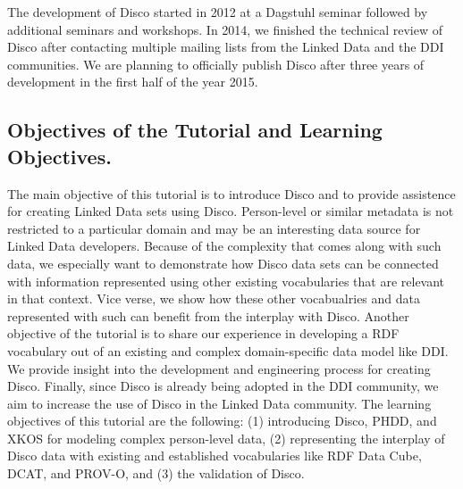 \documentclass{llncs}
\begin{document}
The development of Disco started in 2012 at a Dagstuhl seminar followed by additional seminars and workshops.  
In 2014, we finished the technical review of Disco after contacting multiple mailing lists from the Linked Data and the DDI communities. 
We are planning to officially publish Disco after three years of development in the first half of the year 2015. 

\subsection{Objectives of the Tutorial and Learning Objectives.} 
The main objective of this tutorial is to introduce Disco and to provide assistence for creating Linked Data sets using Disco. Person-level or similar metadata is not restricted to a particular domain and may be an interesting data source for Linked Data developers.
Because of the complexity that comes along with such data, we especially want to demonstrate how Disco data sets can be connected with information represented using other existing vocabularies that are relevant in that context. Vice verse, we show how these other vocabualries and data represented with such can benefit from the interplay with Disco.
Another objective of the tutorial is to share our experience in developing a RDF vocabulary out of an existing and complex domain-specific data model like DDI. We provide insight into the development and engineering process for creating Disco.
Finally, since Disco is already being adopted in the DDI community, we aim to increase the use of Disco in the Linked Data community.
The learning objectives of this tutorial are the following: (1) introducing Disco, PHDD, and XKOS for modeling complex person-level data, (2) representing the interplay of Disco data with existing and established vocabularies like RDF Data Cube, DCAT, and PROV-O, and (3) the validation of Disco.
\end{document}
